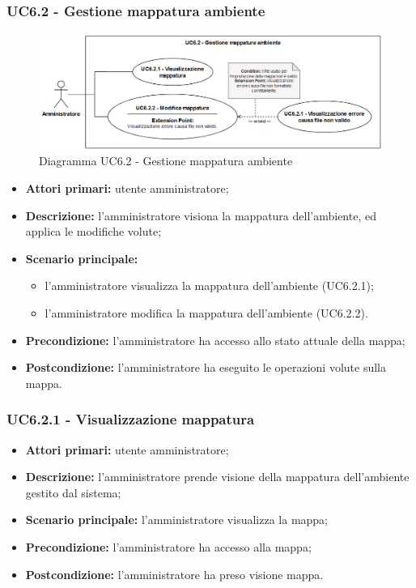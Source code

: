 \subsubsection{UC6.2 - Gestione mappatura ambiente}
	\begin{figure}[H]
		\centering
		\includegraphics[width=16cm]{images/UC6.2.png}
		\caption{Diagramma UC6.2 - Gestione mappatura ambiente}
	\end{figure}
	\begin{itemize}
		\item \textbf{Attori primari:} utente amministratore;
		\item \textbf{Descrizione:} l'amministratore visiona la mappatura dell'ambiente, ed applica le modifiche volute;
		\item \textbf{Scenario principale:} 
			\begin{itemize}
				\item l'amministratore visualizza la mappatura dell'ambiente (UC6.2.1);
				\item l'amministratore modifica la mappatura dell'ambiente (UC6.2.2).
			\end{itemize}
		\item \textbf{Precondizione:} l'amministratore ha accesso allo stato attuale della mappa;
		\item \textbf{Postcondizione:} l'amministratore ha eseguito le operazioni volute sulla mappa.
	\end{itemize}

	\subsubsection{UC6.2.1 - Visualizzazione mappatura}
	\begin{itemize}
		\item \textbf{Attori primari:} utente amministratore;
		\item \textbf{Descrizione:} l'amministratore prende visione della mappatura dell'ambiente gestito dal sistema;
		\item \textbf{Scenario principale:} l'amministratore visualizza la mappa;
		\item \textbf{Precondizione:} l'amministratore ha accesso alla mappa;
		\item \textbf{Postcondizione:} l'amministratore ha preso visione mappa.
	\end{itemize}

